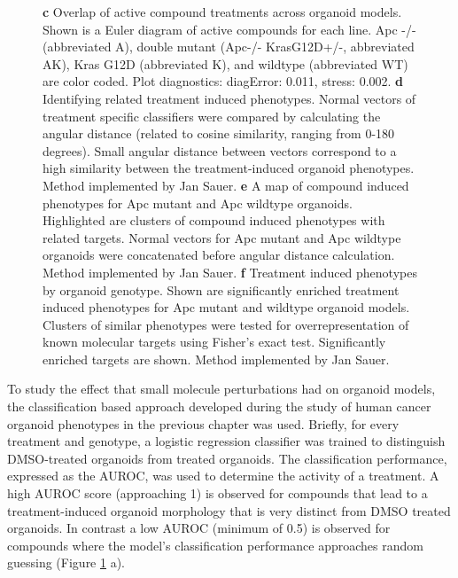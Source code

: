 \begin{flushleft}
\begin{figure}[h!]
{\textbf{c} Overlap of active compound treatments across organoid models. Shown is a Euler diagram of active compounds for each line. Apc -/- (abbreviated A), double mutant (Apc-/- KrasG12D+/-, abbreviated AK), Kras G12D (abbreviated K), and wildtype (abbreviated WT) are color coded. Plot diagnostics: diagError: 0.011, stress: 0.002.
\textbf{d} Identifying related treatment induced phenotypes. Normal vectors of treatment specific classifiers were compared by calculating the angular distance (related to cosine similarity, ranging from 0-180 degrees). Small angular distance between vectors correspond to a high similarity between the treatment-induced organoid phenotypes. Method implemented by Jan Sauer.
\textbf{e} A map of compound induced phenotypes for Apc mutant and Apc wildtype organoids. Highlighted are clusters of compound induced phenotypes with related targets. Normal vectors for Apc mutant and Apc wildtype organoids were concatenated before angular distance calculation. Method implemented by Jan Sauer.
\textbf{f} Treatment induced phenotypes by organoid genotype. Shown are significantly enriched treatment induced phenotypes for Apc mutant and wildtype organoid models. Clusters of similar phenotypes were tested for overrepresentation of known molecular targets using Fisher’s exact test. Significantly enriched targets are shown. Method implemented by Jan Sauer.
}
\label{fig_150}
\end{figure}
\bigbreak

To study the effect that small molecule perturbations had on organoid models, the classification based approach developed during the study of human cancer organoid phenotypes in the previous chapter was used. Briefly, for every treatment and genotype, a logistic regression classifier was trained to distinguish DMSO-treated organoids from treated organoids. The classification performance, expressed as the AUROC, was used to determine the activity of a treatment. A high AUROC score (approaching 1) is observed for compounds that lead to a treatment-induced organoid morphology that is very distinct from DMSO treated organoids. In contrast a low AUROC (minimum of 0.5) is observed for compounds where the model's classification performance approaches random guessing (Figure \ref{fig_150} a).


\end{flushleft}
